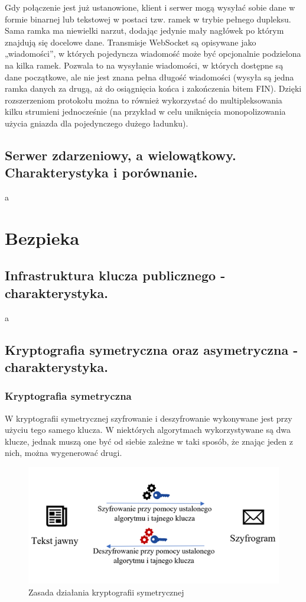 \documentclass[a4paper,12pt,oneside]{book}
\begin{document}
			Gdy połączenie jest już ustanowione, klient i serwer mogą wysyłać sobie dane w formie binarnej lub tekstowej w postaci tzw. ramek w trybie pełnego dupleksu. Sama ramka ma niewielki narzut, dodając jedynie mały nagłówek po którym znajdują się docelowe dane. Transmisje WebSocket są opisywane jako „wiadomości”, w których pojedyncza wiadomość może być opcjonalnie podzielona na kilka ramek. Pozwala to na wysyłanie wiadomości, w których dostępne są dane początkowe, ale nie jest znana pełna długość wiadomości (wysyła są jedna ramka danych za drugą, aż do osiągnięcia końca i zakończenia bitem FIN). Dzięki rozszerzeniom protokołu można to również wykorzystać do multipleksowania kilku strumieni jednocześnie (na przykład w celu uniknięcia monopolizowania użycia gniazda dla pojedynczego dużego ładunku).
		
		
			\newpage\subsection{\color{red}Serwer zdarzeniowy, a wielowątkowy. Charakterystyka i porównanie.}
				a
		
		\newpage\section{Bezpieka}
			\subsection{\color{red}Infrastruktura klucza publicznego - charakterystyka.}
				a
			
			\newpage\subsection{Kryptografia symetryczna oraz asymetryczna - charakterystyka.}
				
				\subsubsection*{Kryptografia symetryczna}
				
				W kryptografii symetrycznej szyfrowanie i deszyfrowanie wykonywane jest przy użyciu tego samego klucza. W niektórych algorytmach wykorzystywane są dwa klucze, jednak muszą one być od siebie zależne w taki sposób, że znając jeden z nich, można wygenerować drugi.
				
				\begin{figure}[h!]
					\centering\includegraphics[scale=0.45]{krypt_sym.png}
					\caption{Zasada działania kryptografii symetrycznej}
				\end{figure}
				
\end{document}
